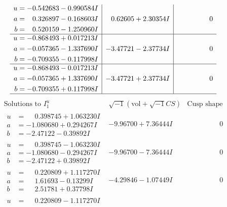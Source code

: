 \documentclass[1p]{elsarticle_modified}
\theoremstyle{definition}
\newcommand{\I}{\sqrt{-1}}
\begin{document}
$$\begin{array}{c|c|c}
\begin{aligned}
u &= -0.542683 - 0.990584 I \\
a &= \phantom{-}0.326897 - 0.168603 I \\
b &= \phantom{-}0.520159 - 1.250960 I\end{aligned}
 & \phantom{-}0.62605 + 2.30354 I & \phantom{-0.000000 } 0 \\ \hline\begin{aligned}
u &= -0.868493 + 0.017213 I \\
a &= -0.057365 - 1.337690 I \\
b &= -0.709355 - 0.117998 I\end{aligned}
 & -3.47721 - 2.37734 I & \phantom{-0.000000 } 0 \\ \hline\begin{aligned}
u &= -0.868493 - 0.017213 I \\
a &= -0.057365 + 1.337690 I \\
b &= -0.709355 + 0.117998 I\end{aligned}
 & -3.47721 + 2.37734 I & \phantom{-0.000000 } 0\\
 \hline 
 \end{array}$$\newpage$$\begin{array}{c|c|c}  
\text{Solutions to }I^u_{1}& \I (\text{vol} + \sqrt{-1}CS) & \text{Cusp shape}\\
 \hline 
\begin{aligned}
u &= \phantom{-}0.398745 + 1.063230 I \\
a &= -1.080680 + 0.294267 I \\
b &= -2.47122 - 0.39892 I\end{aligned}
 & -9.96700 + 7.36444 I & \phantom{-0.000000 } 0 \\ \hline\begin{aligned}
u &= \phantom{-}0.398745 - 1.063230 I \\
a &= -1.080680 - 0.294267 I \\
b &= -2.47122 + 0.39892 I\end{aligned}
 & -9.96700 - 7.36444 I & \phantom{-0.000000 } 0 \\ \hline\begin{aligned}
u &= \phantom{-}0.220809 + 1.117270 I \\
a &= \phantom{-}1.61693 - 0.13299 I \\
b &= \phantom{-}2.51781 + 0.37798 I\end{aligned}
 & -4.29846 - 1.07449 I & \phantom{-0.000000 } 0 \\ \hline\begin{aligned}
u &= \phantom{-}0.220809 - 1.117270 I \\

\end{aligned}
\end{array}$$
\end{document}
